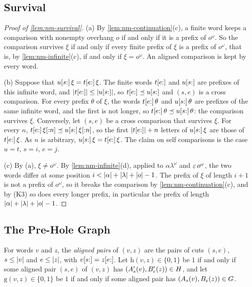 \subsection{Survival}\label{app:nm-survival}

\begin{proof}[Proof of \cref{lem:nm-survival}]
(a) By \cref{lem:nm-continuation}(c), a finite word keeps a comparison with
nonempty overhang $o$ if and only if it is a prefix of $o^\omega$. So the
comparison survives $\xi$ if and only if every finite prefix of $\xi$ is a
prefix of $o^\omega$, that is, by \cref{lem:nm-infinite}(c), if and only if
$\xi=o^\omega$. An aligned comparison is kept by every word.

(b) Suppose that $u[s{:}]\,\xi=t[e{:}]\,\xi$. The finite words $t[e{:}]$ and
$u[s{:}]$ are prefixes of this infinite word, and
$\lvert t[e{:}]\rvert\le\lvert u[s{:}]\rvert$, so $t[e{:}]\preceq u[s{:}]$ and $(s,e)$ is a
cross comparison. For every prefix $\theta$ of $\xi$, the words
$t[e{:}]\,\theta$ and $u[s{:}]\,\theta$ are prefixes of the same infinite word,
and the first is not longer, so $t[e{:}]\,\theta\preceq u[s{:}]\,\theta$: the
comparison survives $\xi$. Conversely, let $(s,e)$ be a cross comparison that
survives $\xi$. For every $n$, $t[e{:}]\,\xi[{:}n]\preceq u[s{:}]\,\xi[{:}n]$,
so the first $\lvert t[e{:}]\rvert+n$ letters of $u[s{:}]\,\xi$ are those of
$t[e{:}]\,\xi$. As $n$ is arbitrary, $u[s{:}]\,\xi=t[e{:}]\,\xi$. The claim
on self comparisons is the case $u=t$, $s=i$, $e=j$.

(c) By (a), $\xi\ne o^\omega$. By \cref{lem:nm-infinite}(d), applied to
$\alpha\lambda^\omega$ and $\varepsilon\,o^\omega$, the two words differ at some
position $i<\lvert \alpha\rvert+\lvert \lambda\rvert+\lvert o\rvert-1$. The prefix of $\xi$ of length
$i+1$ is not a prefix of $o^\omega$, so it breaks the comparison by
\cref{lem:nm-continuation}(c), and by (K3) so does every longer prefix, in
particular the prefix of length $\lvert \alpha\rvert+\lvert \lambda\rvert+\lvert o\rvert-1$.
\end{proof}

\subsection{The Pre-Hole Graph}\label{app:nm-graph}

For words $v$ and $z$, the \emph{aligned pairs} of $(v,z)$ are the pairs of
cuts $(s,e)$, $s\le\lvert v\rvert$ and $e\le\lvert z\rvert$, with $v[s{:}]=z[e{:}]$. Let
$\mathrm h(v,z)\in\{0,1\}$ be $1$ if and only if some aligned pair $(s,e)$ of
$(v,z)$ has $(A'_s(v),B'_e(z))\in H$, and let $\mathrm g(v,z)\in\{0,1\}$ be
$1$ if and only if some aligned pair has $(A_s(v),B_e(z))\in G$.

